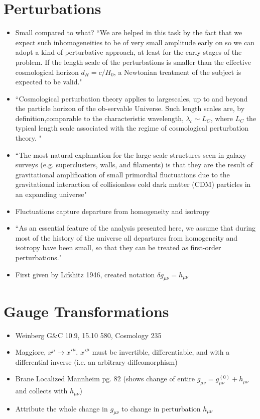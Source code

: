 \documentclass[10pt,letterpaper]{article}
\numberwithin{equation}{section}
\begin{document}
\section*{Perturbations}
\begin{itemize}
	\item Small compared to what? ``We are helped in this task by the fact that we expect such inhomogeneities to be of very small amplitude early on so we can adopt a kind of perturbative approach, at least for the early stages of the problem. If the length scale of the perturbations is smaller than the effective cosmological horizon $d_H = c / H_0$, a Newtonian treatment of the subject is expected to be valid."
	\item ``Cosmological   perturbation   theory   applies   to   largescales, up to and beyond the particle horizon of the ob-servable Universe.  Such length scales are, by definition,comparable  to  the  characteristic  wavelength, $\lambda_c \sim L_C$, where $L_C$ the typical length scale associated with the regime of cosmological perturbation theory. "
	\item ``The most natural explanation for the large-scale structures seen in galaxy surveys (e.g. superclusters, walls, and filaments) is that they are the result of gravitational amplification of small primordial fluctuations due to the gravitational interaction of collisionless cold dark matter (CDM) particles in an expanding universe"
	\item Fluctuations capture departure from homogeneity and isotropy
	\item ``As an essential feature of the analysis presented here, we assume that during most of the history of the universe all departures from homogeneity and isotropy have been small, so that they can be treated as first-order perturbations."
	\item First given by Lifshitz 1946, created notation $\delta g_{\mu\nu} = h_{\mu\nu}$
	\end{itemize}
	
\section*{Gauge Transformations}
\begin{itemize}	
	\item Weinberg G\&C 10.9, 15.10 580, Cosmology 235
	\item Maggiore, $x^\mu \to x'^\mu$. $x'^\mu$ must be invertible, differentiable, and with a differential inverse (i.e. an arbitrary diffeomorphism)
	\item Brane Localized Mannheim pg. 82 (shows change of entire $g_{\mu\nu} = g_{\mu\nu}^{(0)}+h_{\mu\nu}$ and collects with $h_{\mu\nu}$)
	\item Attribute the whole change in $g_{\mu\nu}$ to change in perturbation $h_{\mu\nu}$
\end{itemize}
\end{document}
